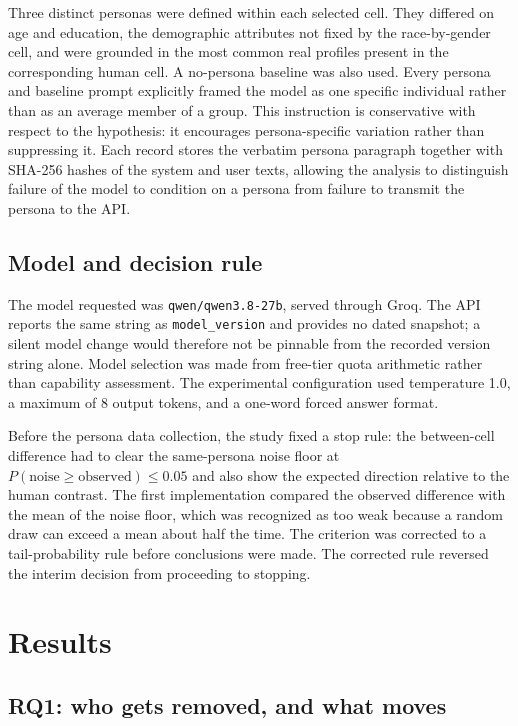 \documentclass[11pt,a4paper]{article}
\begin{document}
Three distinct personas were defined within each selected cell. They differed on age and
education, the demographic attributes not fixed by the race-by-gender cell, and were grounded in
the most common real profiles present in the corresponding human cell. A no-persona baseline was
also used. Every persona and baseline prompt explicitly framed the model as one specific
individual rather than as an average member of a group. This instruction is conservative with
respect to the hypothesis: it encourages persona-specific variation rather than suppressing it.
Each record stores the verbatim persona paragraph together with SHA-256 hashes of the system and
user texts, allowing the analysis to distinguish failure of the model to condition on a persona
from failure to transmit the persona to the API.

\subsection{Model and decision rule}

The model requested was \texttt{qwen/qwen3.8-27b}, served through Groq. The API reports the same
string as \texttt{model\_version} and provides no dated snapshot; a silent model change would
therefore not be pinnable from the recorded version string alone. Model selection was made from
free-tier quota arithmetic rather than capability assessment. The experimental configuration used
temperature 1.0, a maximum of 8 output tokens, and a one-word forced answer format.

Before the persona data collection, the study fixed a stop rule: the between-cell difference had
to clear the same-persona noise floor at $P(\text{noise} \geq \text{observed}) \leq 0.05$ and also
show the expected direction relative to the human contrast. The first implementation compared the
observed difference with the mean of the noise floor, which was recognized as too weak because a
random draw can exceed a mean about half the time. The criterion was corrected to a
tail-probability rule before conclusions were made. The corrected rule reversed the interim
decision from proceeding to stopping.

\section{Results}

\subsection{RQ1: who gets removed, and what moves}
\end{document}
